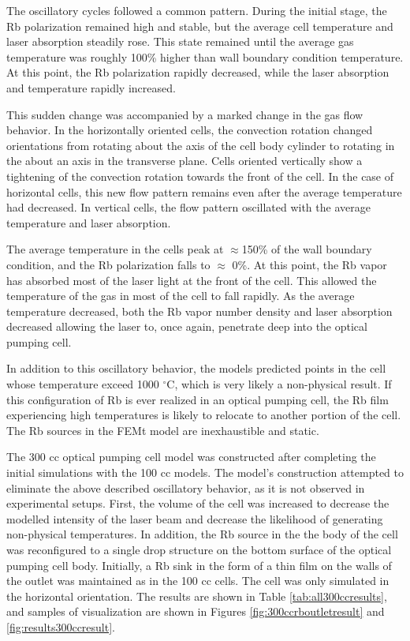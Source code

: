 The oscillatory cycles followed a common pattern. During the initial stage, the Rb polarization remained high and stable, but the average cell temperature and laser absorption steadily rose. This state remained until the average gas temperature was roughly 100\% higher than wall boundary condition temperature. At this point, the Rb polarization rapidly decreased, while the laser absorption and temperature rapidly increased. 

This sudden change was accompanied by a marked change in the gas flow behavior. In the horizontally oriented cells, the convection rotation changed orientations from rotating about the axis of the cell body cylinder to rotating in the about an axis in the transverse plane. Cells oriented vertically show a tightening of the convection rotation towards the front of the cell. In the case of horizontal cells, this new flow pattern remains even after the average temperature had decreased. In vertical cells, the flow pattern oscillated with the average temperature and laser absorption. 

The average temperature in the cells peak at $\approx$150\% of the wall boundary condition, and the Rb polarization falls to $\approx$ 0\%. At this point, the Rb vapor has absorbed most of the laser light at the front of the cell. This allowed the temperature of the gas in most of the cell to fall rapidly. As the average temperature decreased, both the Rb vapor number density and laser absorption decreased allowing the laser to, once again, penetrate deep into the optical pumping cell.

In addition to this oscillatory behavior, the models predicted points in the cell whose temperature exceed 1000 $^{\circ}$C, which is very likely a non-physical result. If this configuration of Rb is ever realized in an optical pumping cell, the Rb film experiencing high temperatures is likely to relocate to another portion of the cell. The Rb sources in the FEMt model are inexhaustible and static.

The 300 cc optical pumping cell model was constructed after completing the initial simulations with the 100 cc models. The model's construction attempted to eliminate the above described oscillatory behavior, as it is not observed in experimental setups. First, the volume of the cell was increased to decrease the modelled intensity of the laser beam and decrease the likelihood of generating non-physical temperatures. In addition, the Rb source in the the body of the cell was reconfigured to a single drop structure on the bottom surface of the optical pumping cell body. Initially, a Rb sink in the form of a thin film on the walls of the outlet was maintained as in the 100 cc cells. The cell was only simulated in the horizontal orientation. The results are shown in Table \ref{tab:all300ccresults}, and samples of visualization are shown in Figures \ref{fig:300ccrboutletresult} and \ref{fig:results300ccresult}. 


